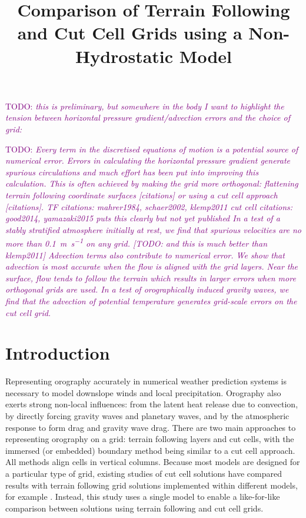 \documentclass{ametsoc}
\title{Comparison of Terrain Following and Cut Cell Grids using a Non-Hydrostatic Model}
\affiliation{Department of Meteorology, University of Reading, Reading, United Kingdom}
\newcommand{\TODO}[1]{\textcolor{purple}{TODO: \emph{#1}}}
\begin{document}
\maketitle
\TODO{this is preliminary, but somewhere in the body I want to highlight the tension between horizontal pressure gradient/advection errors and the choice of grid:}

\TODO{Every term in the discretised equations of motion is a potential source of numerical error.
 Errors in calculating the horizontal pressure gradient generate spurious circulations and much effort has been put into improving this calculation.  This is often achieved by making the grid more orthogonal: flattening terrain following coordinate surfaces [citations] or using a cut cell approach [citations].
 TF citations: mahrer1984, schaer2002, klemp2011
 cut cell citations: good2014, yamazaki2015 puts this clearly but not yet published
 In a test of a stably stratified atmosphere initially at rest, we find that spurious velocities are no more than \SI{0.1}{\meter\per\second} on any grid. [TODO: and this is much better than klemp2011]
 Advection terms also contribute to numerical error.  We show that advection is most accurate when the flow is aligned with the grid layers.  Near the surface, flow tends to follow the terrain which results in larger errors when more orthogonal grids are used.
 In a test of orographically induced gravity waves, we find that the advection of potential temperature generates grid-scale errors on the cut cell grid.}

\section{Introduction}
Representing orography accurately in numerical weather prediction systems is necessary to model downslope winds and local precipitation.  Orography also exerts strong non-local influences: from the latent heat release due to convection, by directly forcing gravity waves and planetary waves, and by the atmospheric response to form drag and gravity wave drag.  There are two main approaches to representing orography on a grid: terrain following layers and cut cells, with the immersed (or embedded) boundary method \citep{simon2012} being similar to a cut cell approach.  All methods align cells in vertical columns.  Because most models are designed for a particular type of grid, existing studies of cut cell solutions have compared results with terrain following grid solutions implemented within different models, for example \citet{good2014}.  Instead, this study uses a single model to enable a like-for-like comparison between solutions using terrain following and cut cell grids.
\end{document}
